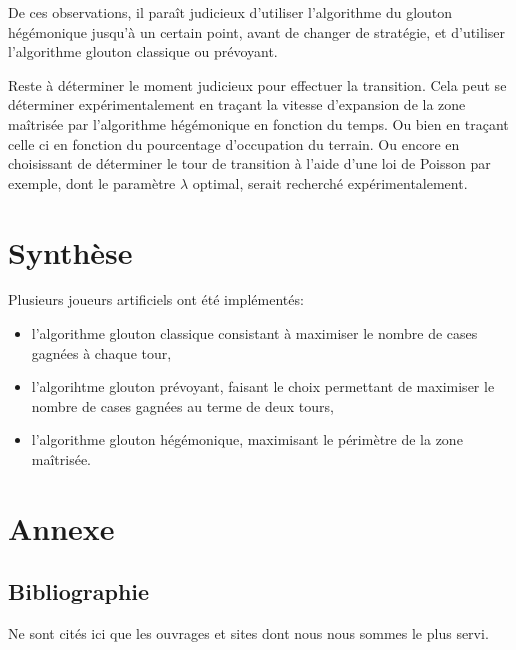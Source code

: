 \documentclass[12pt,a4paper,twoside]{article}
\begin{document}
De ces observations, il paraît judicieux d'utiliser l'algorithme du
glouton hégémonique jusqu'à un certain point, avant de changer de
stratégie, et d'utiliser l'algorithme glouton classique ou prévoyant.

Reste à déterminer le moment judicieux pour effectuer la
transition. Cela peut se déterminer expérimentalement en traçant la
vitesse d'expansion de la zone maîtrisée par l'algorithme hégémonique
en fonction du temps. Ou bien en traçant celle ci en fonction du
pourcentage d'occupation du terrain. Ou encore en choisissant de
déterminer le tour de transition à l'aide d'une loi de Poisson par
exemple, dont le paramètre \(\lambda\) optimal, serait recherché
expérimentalement.
 
\section{Synthèse}
\label{sec:orgheadline26}
\label{sec:conclusion}
Plusieurs joueurs artificiels ont été implémentés: 
\begin{itemize}
\item l'algorithme glouton classique consistant à maximiser le nombre
  de cases gagnées à chaque tour,
\item l'algorihtme glouton prévoyant, faisant le choix permettant de
  maximiser le nombre de cases gagnées au terme de deux tours,
\item l'algorithme glouton hégémonique, maximisant le périmètre de la
  zone maîtrisée.
\end{itemize}


\clearpage\appendix

\section{Annexe}
\label{sec:orgheadline28}
\subsection{Bibliographie}
\label{sec:orgheadline27}
Ne sont cités ici que les ouvrages et sites dont nous nous sommes le plus
servi.

\def\section*#1{}

\nocite{*}

\clearpage
\end{document}
